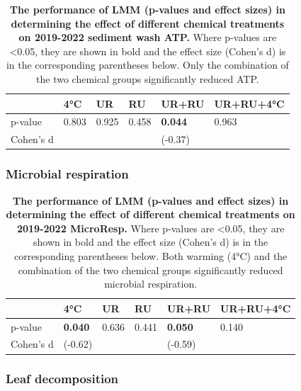 \begin{table}[H]
    \caption{{\bf The performance of LMM (p-values and effect sizes) in determining the effect of different chemical treatments on 2019-2022 sediment wash ATP.} Where p-values are \textless 0.05, they are shown in bold and the effect size (Cohen's d) is in the corresponding parentheses below. Only the combination of the two chemical groups significantly reduced ATP.}
    \centering
    \begin{tabular}{ m{2.5cm}<{\centering}m{1.5cm}<{\centering}m{1.5cm}<{\centering}m{1.5cm}<{\centering}m{1.5cm}<{\centering}m{2.2cm}<{\centering}}
    \toprule
     & 4°C & UR & RU & UR+RU & UR+RU+4°C \\
     \midrule
    p-value & 0.803 & 0.925 & 0.458 & \textbf{0.044} & 0.963 \\
    Cohen's d &  &  &  & (-0.37) &  \\
    \bottomrule
    \end{tabular}    
    \label{tab:ATPSW_3Year}
\end{table}

\subsubsection{Microbial respiration}

\begin{table}[H]
    \caption{{\bf The performance of LMM (p-values and effect sizes) in determining the effect of different chemical treatments on 2019-2022 MicroResp.} Where p-values are \textless 0.05, they are shown in bold and the effect size (Cohen's d) is in the corresponding parentheses below. Both warming (4°C) and the combination of the two chemical groups significantly reduced microbial respiration.}
    \centering
    \begin{tabular}{ m{2.5cm}<{\centering}m{1.5cm}<{\centering}m{1.5cm}<{\centering}m{1.5cm}<{\centering}m{1.5cm}<{\centering}m{2.2cm}<{\centering}}
    \toprule
     & 4°C & UR & RU & UR+RU & UR+RU+4°C \\
     \midrule
    p-value & \textbf{0.040} & 0.636 & 0.441 & \textbf{0.050} & 0.140 \\
    Cohen's d & (-0.62) &  &  & (-0.59) &  \\
    \bottomrule
    \end{tabular}    
    \label{tab:MicroResp_3Year}
\end{table}

\subsubsection{Leaf decomposition}

